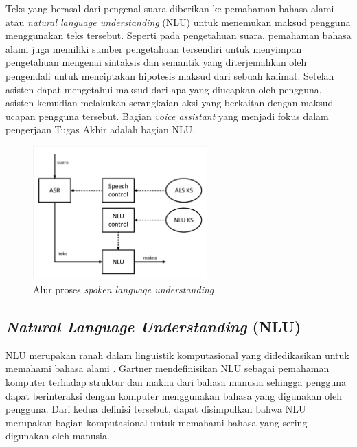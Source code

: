 Teks yang berasal dari pengenal suara diberikan ke pemahaman bahasa alami atau \textit{natural language understanding} (NLU) untuk menemukan maksud pengguna menggunakan teks tersebut. Seperti pada pengetahuan suara, pemahaman bahasa alami juga memiliki sumber pengetahuan tersendiri untuk menyimpan pengetahuan mengenai sintaksis dan semantik yang diterjemahkan oleh pengendali untuk menciptakan hipotesis maksud dari sebuah kalimat. Setelah asisten dapat mengetahui maksud dari apa yang diucapkan oleh pengguna, asisten kemudian melakukan serangkaian aksi yang berkaitan dengan maksud ucapan pengguna tersebut. Bagian \textit{voice assistant} yang menjadi fokus dalam pengerjaan Tugas Akhir adalah bagian NLU.
\begin{figure}[ht]
	\centering
	\includegraphics[width=0.6\textwidth, trim=2 2 2 2, clip]{resources/2/early_slu.pdf}
	\caption{Alur proses \textit{spoken language understanding} \parencite{tur2011spoken}}
	\label{fig:slu_early}
\end{figure}

\subsection{\textit{Natural Language Understanding} (NLU)}

NLU merupakan ranah dalam linguistik komputasional yang didedikasikan untuk memahami bahasa alami \parencite{harris2004voice}. Gartner \parencite{gartnernatural} mendefinisikan NLU sebagai pemahaman komputer terhadap struktur dan makna dari bahasa manusia sehingga pengguna dapat berinteraksi dengan komputer menggunakan bahasa yang digunakan oleh pengguna. Dari kedua definisi tersebut, dapat disimpulkan bahwa NLU merupakan bagian komputasional untuk memahami bahasa yang sering digunakan oleh manusia.

